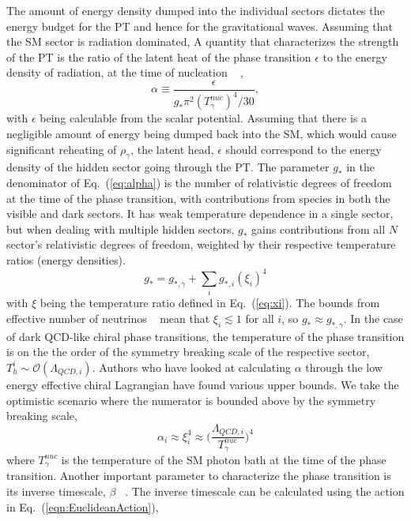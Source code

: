 \documentclass[nofootinbib,twocolumn,preprintnumbers]{revtex4-1}
\begin{document}
The amount of energy density dumped into the individual sectors dictates the energy budget for the PT and hence for the gravitational waves. Assuming that the SM sector is radiation dominated, A quantity that characterizes the strength of the PT is the ratio of the latent heat of the phase transition $\epsilon$ to the energy density of radiation, at the time of nucleation ~\citep{Espinosa:2010hh} ,
\begin{equation}
\alpha     \equiv  \frac{\epsilon}{g_{*} \pi^2 (T^{nuc}_{\gamma})^4/30},
\label{eq:alpha}
\end{equation}
with $\epsilon$ being calculable from the scalar potential. Assuming that there is a negligible amount of energy being dumped back into the SM, which would cause significant reheating of $\rho_{\gamma}$,  the latent head, $\epsilon$ should correspond to the energy density of the hidden sector going through the PT. The parameter $g_{*}$ in the denominator of Eq.~(\ref{eq:alpha}) is the number of relativistic degrees of freedom at the time of the phase transition, with contributions from species in both the visible and dark sectors. It has weak temperature dependence in a single sector, but when dealing with multiple hidden sectors, $g_{*}$ gains contributions from all $N$ sector's relativistic degrees of freedom, weighted by their respective temperature ratios (energy densities).
\begin{equation}\label{eqn:RelaDOF}
g_{*} = g_{*,\gamma} + \sum_{i} g_{*,i} (\xi_{i})^4
\end{equation}
with $\xi$ being the temperature ratio defined in Eq.~(\ref{eq:xi}). The bounds from effective number of neutrinos ~\citep{} mean that $\xi_i \lesssim 1$ for all $i$, so $g_{*} \approx g_{*,\gamma}$. In the case of dark QCD-like chiral  phase transitions, the temperature of the phase transition is on the the order of the symmetry breaking scale of the respective sector, $T_{h}^{i} \sim \mathcal{O}(\Lambda_{QCD,i})$. Authors \citep{Bai:2018dxf} who have looked at calculating $\alpha$ through the low energy effective chiral Lagrangian have found various upper bounds. We take the optimistic scenario where the numerator is bounded above by the symmetry breaking scale, 
%
\begin{equation}
\alpha_i \approx \xi_i^{4} \approx \bigg( \frac{\Lambda_{QCD,i}}{T_{\gamma}^{nuc}}\bigg)^4
\end{equation}
%
where $T_{\gamma}^{nuc}$ is the temperature of the SM photon bath at the time of the phase transition. Another important parameter to characterize the phase transition is its inverse timescale, $\beta$ ~\citep{Caprini:2015zlo}. The inverse timescale can be calculated using the action in Eq.~(\ref{eqn:EuclideanAction}), 
\end{document}
